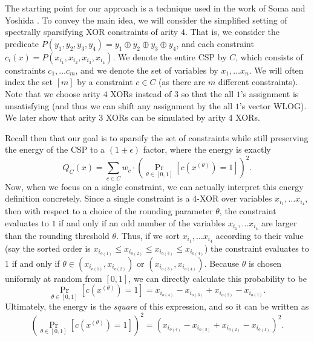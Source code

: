 \documentclass[11pt]{article}
\theoremstyle{definition}
\newcommand{\eps}{\epsilon}
\begin{document}
The starting point for our approach is a technique used in the work of Soma and Yoshida \cite{SY19}. To convey the main idea, we will consider the simplified setting of spectrally sparsifying XOR constraints of arity $4$. That is, we consider the predicate $P(y_1, y_2, y_3, y_4) = y_1 \oplus y_2 \oplus y_3 \oplus y_4$, and each constraint $c_i(x) = P(x_{i_1}, x_{i_2}, x_{i_3}, x_{i_4})$. We denote the entire CSP by $C$, which consists of constraints $c_1, \dots c_m$, and we denote the set of variables by $x_1, \dots x_n$. We will often index the set $[m]$ by a constraint $c \in C$ (as there are $m$ different constraints). Note that we choose arity $4$ XORs instead of $3$ so that the all $1$'s assignment is unsatisfying (and thus we can shift any assignment by the all $1$'s vector WLOG). We later show that arity $3$ XORs can be simulated by arity $4$ XORs.

Recall then that our goal is to sparsify the set of constraints while still preserving the energy of the CSP to a $(1 \pm \eps)$ factor, where the energy is exactly 
\[
Q_C(x) = \sum_{c \in C} w_c \cdot \left(\Pr_{\theta \in [0,1]}[c(x^{(\theta)}) = 1] \right)^2.
\]
Now, when we focus on a single constraint, we can actually interpret this energy definition concretely. Since a single constraint is a $4$-XOR over variables $x_{i_1}, \dots x_{i_4}$, then with respect to a choice of the rounding parameter $\theta$, the constraint evaluates to $1$ if and only if an odd number of the variables $x_{i_1}, \dots x_{i_4}$ are larger than the rounding threshold $\theta$. Thus, if we sort $x_{i_1}, \dots x_{i_4}$ according to their value (say the sorted order is $x_{i_{o(1)}} \leq x_{i_{o(2)}} \leq x_{i_{o(3)}} \leq x_{i_{o(4)}}$) the constraint evaluates to $1$ if and only if $\theta \in (x_{i_{o(1)}}, x_{i_{o(2)}})$ or $(x_{i_{o(3)}}, x_{i_{o(4)}})$. Because $\theta$ is chosen uniformly at random from $[0,1]$, we can directly calculate this probability to be
\[
\Pr_{\theta \in [0,1]}[c(x^{(\theta)}) = 1] = x_{i_{o(4)}} -x_{i_{o(3)}} + x_{i_{o(2)}} - x_{i_{o(1)}}.
\]
Ultimately, the energy is the \emph{square} of this expression, and so it can be written as 
\[
\left ( \Pr_{\theta \in [0,1]}[c(x^{(\theta)}) = 1] \right )^2 = \left ( x_{i_{o(4)}} -x_{i_{o(3)}} + x_{i_{o(2)}} - x_{i_{o(1)}} \right )^2.
\]
\end{document}
